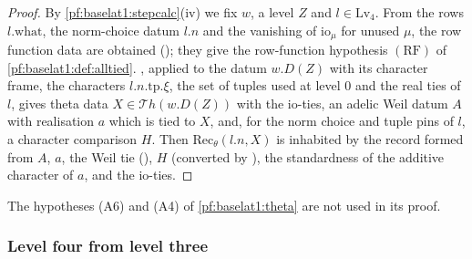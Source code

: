 \begin{proof}
By \cref{pf:baselat1:stepcalc}(iv) we fix $w$, a level $Z$ and $l\in\mathrm{Lv}_4$. From the rows
$l.\mathrm{what}$, the norm-choice datum $l.n$ and the vanishing of $\mathrm{io}_\mu$ for unused $\mu$, the
row function data are obtained (); they give the row-function
hypothesis $(\mathrm{RF})$ of \cref{pf:baselat1:def:alltied}.
, applied to the datum $w.D(Z)$ with its character frame, the characters
$l.n.\mathrm{tp}.\xi$, the set of tuples used at level $0$ and the real ties of $l$,
gives theta data $X\in\mathcal{T}h(w.D(Z))$ with the $\mathrm{io}$-ties, an adelic Weil datum $A$ with
realisation $a$ which is tied to $X$, and, for the norm choice and tuple pins of $l$, a character comparison
$H$. Then $\mathrm{Rec}_{\theta}(l.n,X)$ is inhabited by the record formed from $A$, $a$, the Weil tie
(), $H$ (converted by
), the standardness of the additive character of $a$, and
the $\mathrm{io}$-ties.
\end{proof}

\begin{remark}\label{pf:baselat1:rem:theta}
The hypotheses (A6) and (A4) of \cref{pf:baselat1:theta} are
not used in its proof.
\end{remark}

\subsubsection{Level four from level three}

